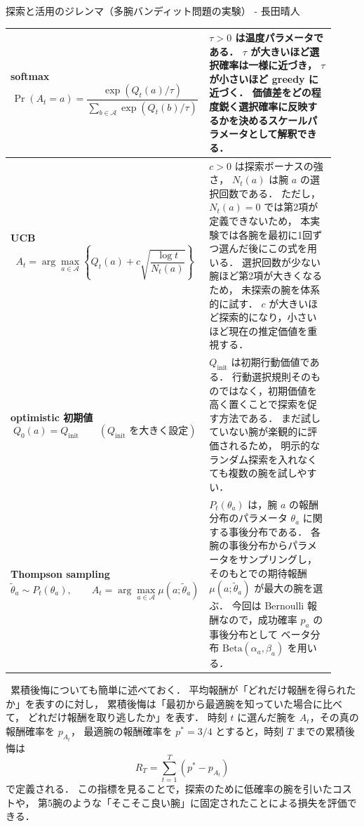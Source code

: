 \begin{column}{探索と活用のジレンマ（多腕バンディット問題の実験） - 長田晴人}
\begin{center}
\begin{tabular}{p{0.42\linewidth}p{0.50\linewidth}}
      \midrule

      \textbf{softmax}
      \[
      \Pr(A_t=a)
      =
      \frac{\exp(Q_t(a)/\tau)}
      {\sum_{b\in\mathcal{A}}\exp(Q_t(b)/\tau)}
      \]
      &
      $\tau>0$ は温度パラメータである．
      $\tau$ が大きいほど選択確率は一様に近づき，
      $\tau$ が小さいほど greedy に近づく．
      価値差をどの程度鋭く選択確率に反映するかを決めるスケールパラメータとして解釈できる．
      \\

      \midrule

      \textbf{UCB}
      \[
      A_t
      =
      \arg\max_{a\in\mathcal{A}}
      \left\{
      Q_t(a)
      +
      c\sqrt{\frac{\log t}{N_t(a)}}
      \right\}
      \]
      &
      $c>0$ は探索ボーナスの強さ，
      $N_t(a)$ は腕 $a$ の選択回数である．
      ただし，$N_t(a)=0$ では第2項が定義できないため，
      本実験では各腕を最初に1回ずつ選んだ後にこの式を用いる．
      選択回数が少ない腕ほど第2項が大きくなるため，
      未探索の腕を体系的に試す．
      $c$ が大きいほど探索的になり，小さいほど現在の推定価値を重視する．
      \\

      \midrule

      \textbf{optimistic 初期値}
      \[
      Q_0(a)=Q_{\mathrm{init}}
      \qquad
      (Q_{\mathrm{init}}\text{ を大きく設定})
      \]
      &
      $Q_{\mathrm{init}}$ は初期行動価値である．
      行動選択規則そのものではなく，初期価値を高く置くことで探索を促す方法である．
      まだ試していない腕が楽観的に評価されるため，
      明示的なランダム探索を入れなくても複数の腕を試しやすい．
      \\

      \midrule

      \textbf{Thompson sampling}
      \[
      \tilde{\theta}_a \sim P_t(\theta_a),
      \qquad
      A_t=\arg\max_{a\in\mathcal{A}}\mu(a;\tilde{\theta}_a)
      \]
      &
      $P_t(\theta_a)$ は，腕 $a$ の報酬分布のパラメータ $\theta_a$ に関する事後分布である．
      各腕の事後分布からパラメータをサンプリングし，
      そのもとでの期待報酬 $\mu(a;\tilde{\theta}_a)$ が最大の腕を選ぶ．
      今回は Bernoulli 報酬なので，成功確率 $p_a$ の事後分布として
      ベータ分布 $\mathrm{Beta}(\alpha_a,\beta_a)$ を用いる．
      \\

      \bottomrule
    \end{tabular}
\end{center}

\ 累積後悔についても簡単に述べておく．
平均報酬が「どれだけ報酬を得られたか」を表すのに対し，
累積後悔は「最初から最適腕を知っていた場合に比べて，
どれだけ報酬を取り逃したか」を表す．
時刻 $t$ に選んだ腕を $A_t$，その真の報酬確率を $p_{A_t}$，
最適腕の報酬確率を $p^\ast=3/4$ とすると，時刻 $T$ までの累積後悔は
\[
    R_T=\sum_{t=1}^{T}\left(p^\ast-p_{A_t}\right)
\]
で定義される．
この指標を見ることで，探索のために低確率の腕を引いたコストや，
第5腕のような「そこそこ良い腕」に固定されたことによる損失を評価できる．


\end{column}
